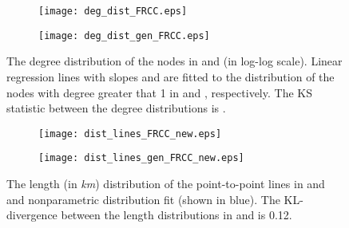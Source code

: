 \documentclass[10pt,journal]{IEEEtran}
\begin{document}
\begin{figure}[t]
\centering
\begin{subfigure}[b]{0.24\textwidth}
\vspace*{-0.2cm}
\texttt{[image: deg\_dist\_FRCC.eps]}
\caption{}
\vspace*{0.2cm}
\end{subfigure}
\begin{subfigure}[b]{0.24\textwidth}
\vspace*{-0.2cm}
\texttt{[image: deg\_dist\_gen\_FRCC.eps]}
\caption{}
\vspace*{0.2cm}
\end{subfigure}
\vspace{-0.6cm}
\caption{The degree distribution of the nodes in  and  (in
log-log scale). Linear regression lines with slopes  and  are fitted  to
the distribution of the nodes with degree greater that 1 in  and , respectively. The KS statistic between the degree distributions is .}
\label{fig:deg_dist_FRCC}
\end{figure}

\begin{figure}[t]
\centering
\begin{subfigure}[b]{0.23\textwidth}
\vspace*{-0.2cm}
\texttt{[image: dist\_lines\_FRCC\_new.eps]}
\caption{}
\vspace*{0.2cm}
\end{subfigure}
\begin{subfigure}[b]{0.23\textwidth}
\vspace*{-0.2cm}
\texttt{[image: dist\_lines\_gen\_FRCC\_new.eps]}
\caption{}
\vspace*{0.2cm}
\end{subfigure}
\vspace{-0.2cm}
\caption{The  length (in \emph{km}) distribution of the point-to-point lines in   and  and nonparametric distribution fit (shown in blue). The KL-divergence between the length distributions in  and  is 0.12.}
\label{fig:dist_lines_FRCC}
\end{figure}
\end{document}
